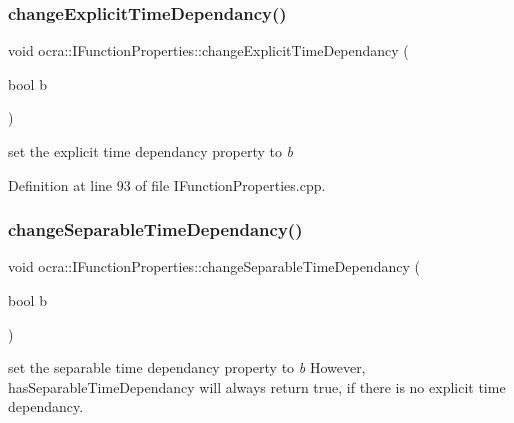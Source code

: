 \hypertarget{classocra_1_1IFunctionProperties_a9081aa3e1561cb63c598e19d6e03797f}{}\label{classocra_1_1IFunctionProperties_a9081aa3e1561cb63c598e19d6e03797f} 
\subsubsection{\texorpdfstring{change\+Explicit\+Time\+Dependancy()}{changeExplicitTimeDependancy()}}
{\footnotesize\ttfamily void ocra\+::\+I\+Function\+Properties\+::change\+Explicit\+Time\+Dependancy (\begin{DoxyParamCaption}\item[{bool}]{b }\end{DoxyParamCaption})\hspace{0.3cm}{\ttfamily [protected]}}

set the explicit time dependancy property to {\itshape b} 

Definition at line 93 of file I\+Function\+Properties.\+cpp.

\hypertarget{classocra_1_1IFunctionProperties_a2277e7388dcfac99b5722a8155deb793}{}\label{classocra_1_1IFunctionProperties_a2277e7388dcfac99b5722a8155deb793} 
\subsubsection{\texorpdfstring{change\+Separable\+Time\+Dependancy()}{changeSeparableTimeDependancy()}}
{\footnotesize\ttfamily void ocra\+::\+I\+Function\+Properties\+::change\+Separable\+Time\+Dependancy (\begin{DoxyParamCaption}\item[{bool}]{b }\end{DoxyParamCaption})\hspace{0.3cm}{\ttfamily [protected]}}

set the separable time dependancy property to {\itshape b} However, has\+Separable\+Time\+Dependancy will always return true, if there is no explicit time dependancy. 

